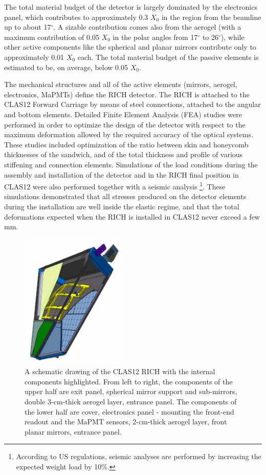 \documentclass[5p,times,twocolumn]{elsarticle}
\def\MaPMT{MaPMT }
\begin{document}
The total material budget of the detector is largely dominated by the electronics panel, which contributes to
approximately 0.3 $X_0$ in the region from the beamline up to about 17$^\circ$. A sizable contribution comes also
from the aerogel (with a maximum contribution of 0.05 $X_0$ in the polar angles from 17$^\circ$ to 26$^\circ$),
while other active components like the spherical and planar mirrors contribute only to approximately 0.01 $X_0$ each.
The total material budget of the passive elements is estimated to be, on average, below 0.05 $X_0$.

The mechanical structures and all of the active elements (mirrors, aerogel, electronics, MaPMTs) define the RICH
detector. The RICH is attached to the CLAS12 Forward Carriage by means of steel connections, attached to the
angular and bottom elements. Detailed Finite Element Analysis (FEA) studies were performed in order to optimize
the design of the detector with respect to the maximum deformation allowed by the required accuracy of the optical
systems. These studies included optimization of the ratio between skin and honeycomb thicknesses of the sandwich,
and of the total thickness and profile of various stiffening and connection elements. Simulations of the load conditions
during the assembly and installation of the detector and in the RICH final position in CLAS12 were also performed
together with a seismic analysis \footnote{According to US regulations, seismic analyses are performed by increasing
the expected weight load by 10\%.}. These simulations demonstrated that all stresses produced on the detector
elements during the installation are well inside the elastic regime, and that the total deformations expected when the
RICH is installed in CLAS12 never exceed a few mm.

\begin{figure}
\begin{center}
\includegraphics[width=0.45\textwidth]{RICH.pdf}
\caption{A schematic drawing of the CLAS12 RICH with the internal components highlighted. From left to right, the 
components of the upper half are exit panel, spherical mirror support and sub-mirrors, double 3-cm-thick aerogel
layer, entrance panel. The components of the lower half are cover, electronics panel - mounting the front-end readout
and the \MaPMT sensors, 2-cm-thick aerogel layer, front planar mirrors, entrance panel.}
\label{Fig:RICHexplo}
\end{center}
\end{figure}
\end{document}
